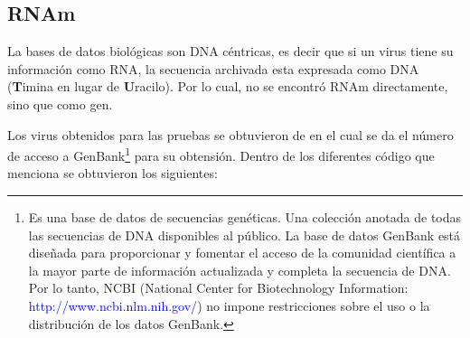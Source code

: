 \documentclass[12pt,a4paper,spanish]{article}
\begin{document}
	\subsection{RNAm}
		\par La bases de datos biológicas son DNA céntricas, es decir que si un virus tiene su información como RNA, la 		secuencia archivada esta expresada como DNA (\textbf{T}imina en lugar de \textbf{U}racilo). Por lo cual, no se 			encontró RNAm directamente, sino que como gen.

		\par Los virus obtenidos para las pruebas se obtuvieron de \cite{holmes} en el cual se da el número de acceso a 		GenBank\footnote{Es una base de datos de secuencias genéticas. Una colección anotada de todas las secuencias de 		DNA disponibles al público. La base de datos GenBank está diseñada para proporcionar y fomentar el acceso de la 		comunidad científica a la mayor parte de información actualizada y completa la secuencia de DNA. Por lo tanto, 			NCBI (National Center for Biotechnology Information: \textcolor{blue}{http://www.ncbi.nlm.nih.gov/}) no impone 			restricciones sobre el uso o la distribución de los datos GenBank.} para su obtensión. Dentro de los diferentes 		código que menciona \cite{holmes} se obtuvieron los siguientes:
\end{document}
